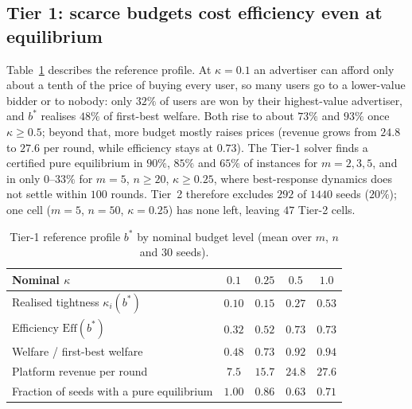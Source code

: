 \documentclass{article}
\theoremstyle{definition}
\newcommand{\Eff}{\mathrm{Eff}}
\begin{document}
\subsection{Tier 1: scarce budgets cost efficiency even at equilibrium}
Table~\ref{tab:t1} describes the reference profile. At $\kappa=0.1$ an advertiser
can afford only about a tenth of the price of buying every user, so many users go to a lower-value bidder
or to nobody: only $32\%$ of users are
won by their highest-value advertiser, and $b^\ast$ realises $48\%$ of first-best welfare. Both rise to
about $73\%$ and $93\%$ once $\kappa\ge0.5$; beyond that, more budget mostly raises prices (revenue grows
from $24.8$ to $27.6$ per round, while efficiency stays at $0.73$). The Tier-1 solver finds a certified pure equilibrium in
$90\%$, $85\%$ and $65\%$ of instances for $m=2,3,5$, and in only $0$--$33\%$ for $m=5$, $n\ge20$,
$\kappa\ge0.25$, where best-response dynamics does not settle within $100$ rounds. Tier~2 therefore excludes $292$ of
$1440$ seeds ($20\%$); one cell ($m=5$, $n=50$, $\kappa=0.25$) has none left, leaving $47$ Tier-2 cells.

\begin{table}[t]
\caption{Tier-1 reference profile $b^\ast$ by nominal budget level (mean over $m$, $n$ and $30$ seeds).}
\label{tab:t1}
\centering\small
\begin{tabular}{@{}lcccc@{}}
\toprule
Nominal $\kappa$ & $0.1$ & $0.25$ & $0.5$ & $1.0$\\
\midrule
Realised tightness $\kappa_i(b^\ast)$ & $0.10$ & $0.15$ & $0.27$ & $0.53$\\
Efficiency $\Eff(b^\ast)$ & $0.32$ & $0.52$ & $0.73$ & $0.73$\\
Welfare / first-best welfare & $0.48$ & $0.73$ & $0.92$ & $0.94$\\
Platform revenue per round & $7.5$ & $15.7$ & $24.8$ & $27.6$\\
Fraction of seeds with a pure equilibrium & $1.00$ & $0.86$ & $0.63$ & $0.71$\\
\bottomrule
\end{tabular}
\end{table}
\end{document}
